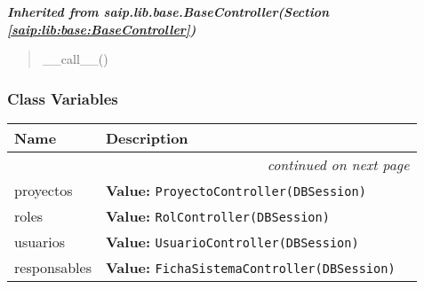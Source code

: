 \large{\textbf{\textit{Inherited from saip.lib.base.BaseController\textit{(Section \ref{saip:lib:base:BaseController})}}}}

\begin{quote}
\_\_call\_\_()
\end{quote}


  \subsubsection{Class Variables}

    \vspace{-1cm}
\hspace{\varindent}\begin{longtable}{|p{\varnamewidth}|p{\vardescrwidth}|l}
\cline{1-2}
\cline{1-2} \centering \textbf{Name} & \centering \textbf{Description}& \\
\cline{1-2}
\endhead\cline{1-2}\multicolumn{3}{r}{\small\textit{continued on next page}}\\\endfoot\cline{1-2}
\endlastfoot\raggedright p\-r\-o\-y\-e\-c\-t\-o\-s\- & \raggedright \textbf{Value:} 
{\tt ProyectoController(DBSession)}&\\
\cline{1-2}
\raggedright r\-o\-l\-e\-s\- & \raggedright \textbf{Value:} 
{\tt RolController(DBSession)}&\\
\cline{1-2}
\raggedright u\-s\-u\-a\-r\-i\-o\-s\- & \raggedright \textbf{Value:} 
{\tt UsuarioController(DBSession)}&\\
\cline{1-2}
\raggedright r\-e\-s\-p\-o\-n\-s\-a\-b\-l\-e\-s\- & \raggedright \textbf{Value:} 
{\tt FichaSistemaController(DBSession)}&\\
\cline{1-2}
\end{longtable}

